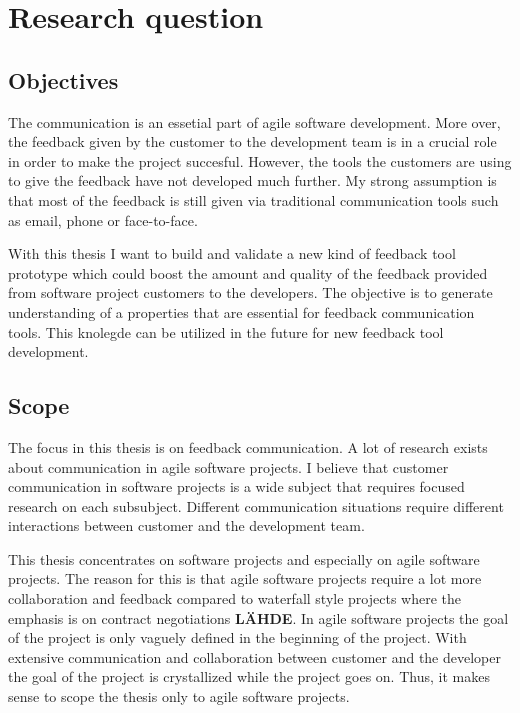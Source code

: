 \documentclass[english,12pt,a4paper,pdftex]{article}
\begin{document}
\clearpage

\section{Research question}

\subsection{Objectives}

The communication is an essetial part of agile software development. More over, the feedback given by the customer to the development team is in a crucial role in order to make the project succesful. However, the tools the customers are using to give the feedback have not developed much further. My strong assumption is that most of the feedback is still given via traditional communication tools such as email, phone or face-to-face.

With this thesis I want to build and validate a new kind of feedback tool prototype which could boost the amount and quality of the feedback provided from software project customers to the developers. The objective is to generate understanding of a properties that are essential for feedback communication tools. This knolegde can be utilized in the future for new feedback tool development.

\subsection{Scope}

The focus in this thesis is on feedback communication. A lot of research exists about communication in agile software projects. I believe that customer communication in software projects is a wide subject that requires focused research on each subsubject. Different communication situations require different interactions between customer and the development team. 

This thesis concentrates on software projects and especially on agile software projects. The reason for this is that agile software projects require a lot more collaboration and feedback compared to waterfall style projects where the emphasis is on contract negotiations \textbf{LÄHDE}. In agile software projects the goal of the project is only vaguely defined in the beginning of the project. With extensive communication and collaboration between customer and the developer the goal of the project is crystallized while the project goes on. Thus, it makes sense to scope the thesis only to agile software projects.
\end{document}
